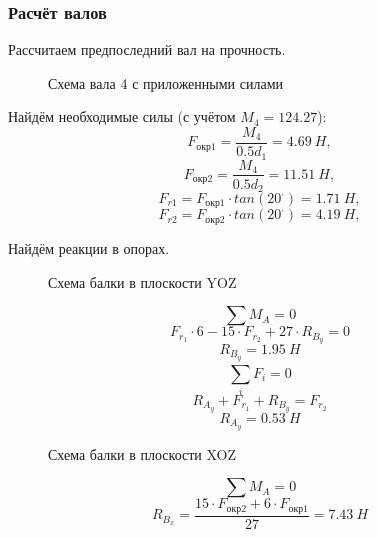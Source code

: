 \documentclass[14pt,a4paper,russian]{scrartcl}
\begin{document}
    \subsubsection{Расчёт валов}
        Рассчитаем предпоследний вал на прочность. 
        \begin{figure}[h]
            \caption{Схема вала 4 с приложенными силами}
        \end{figure}
        Найдём необходимые силы (с учётом \( M_4 = 124.27 \)):
        \[ F_{\text{окр1}} = \frac{M_4}{0.5d_1} = 4.69\ H,\]
        \[ F_{\text{окр2}} = \frac{M_4}{0.5d_2} = 11.51\ H,\]
        \[ F_{r1} = F_{\text{окр1}}\cdot tan(20^\cdot) = 1.71\ H,\]
        \[ F_{r2} = F_{\text{окр2}}\cdot tan(20^\cdot) = 4.19\ H,\]

        Найдём реакции в опорах.\par
        \begin{figure}[h]
            \caption{Схема балки в плоскости YOZ}
        \end{figure}
        \[ \sum M_A = 0 \]
        \[ F_{r_1}\cdot 6 - 15\cdot F_{r_2} + 27\cdot R_{B_y} = 0\]
        \[ R_{B_y} = 1.95\ H\]
        \[ \sum_{i}^{}F_i = 0 \]
        \[ R_{A_y} + F_{r_1} + R_{B_y} = F_{r_2} \]
        \[ R_{A_y} = 0.53\ H\]        
        
        \begin{figure}[h]
            \caption{Схема балки в плоскости XOZ}
        \end{figure}
        \[ \sum M_A = 0 \]
        \[ R_{B_x} = \frac{15\cdot F_{\text{окр2}} + 6\cdot F_{\text{окр1}}}{27} = 7.43\ H\]
        
\end{document}
